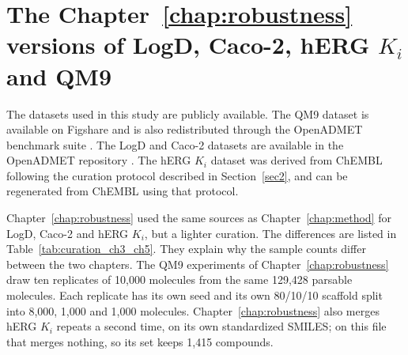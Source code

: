 \section{\texorpdfstring{The Chapter~\ref{chap:robustness} versions of LogD, Caco-2, hERG $K_i$ and QM9}{The Chapter 3 versions of LogD, Caco-2, hERG Ki and QM9}}\label{app:datasets:ch3}

The datasets used in this study are publicly available. The QM9 dataset is available on Figshare \citep{qm9_dataset} and is also redistributed through the OpenADMET benchmark suite \citep{Ramakrishnan2014, openadmet}. The LogD and Caco-2 datasets are available in the OpenADMET repository \citep{openadmet}. The hERG $K_i$ dataset was derived from ChEMBL \citep{Zdrazil2023} following the curation protocol described in Section~\ref{sec2}, and can be regenerated from ChEMBL using that protocol.

Chapter~\ref{chap:robustness} used the same sources as Chapter~\ref{chap:method} for LogD, Caco-2 and hERG $K_i$, but a lighter curation. The differences are listed in Table~\ref{tab:curation_ch3_ch5}. They explain why the sample counts differ between the two chapters. The QM9 experiments of Chapter~\ref{chap:robustness} draw ten replicates of 10,000 molecules from the same 129,428 parsable molecules. Each replicate has its own seed and its own 80/10/10 scaffold split into 8,000, 1,000 and 1,000 molecules. Chapter~\ref{chap:robustness} also merges hERG $K_i$ repeats a second time, on its own standardized SMILES; on this file that merges nothing, so its set keeps 1,415 compounds.

